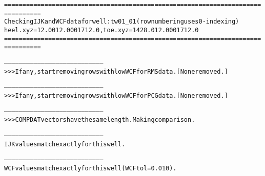 \begin{alltt}
================================================================================
Checking IJK and WCF data for well: tw01_01 (row numbering uses 0-indexing)
heel.xyz = 12.00 12.000 1712.0, toe.xyz = 1428.0 12.000 1712.0
================================================================================

--------------------------------------------------------------------------------
>>> If any, start removing rows with low WCF for RMS data. [None removed.]

--------------------------------------------------------------------------------
>>> If any, start removing rows with low WCF for PCG data. [None removed.]

--------------------------------------------------------------------------------
>>> COMPDAT vectors have the same length. Making comparison.

--------------------------------------------------------------------------------
IJK values match exactly for this well.

--------------------------------------------------------------------------------
WCF values match exactly for this well (WCF tol = 0.010).
\end{alltt}
